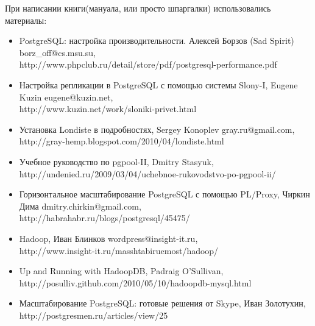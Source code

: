 \thispagestyle{empty}
При написании книги(мануала, или просто шпаргалки) использовались материалы:
\begin{itemize}
\item PostgreSQL: настройка производительности. Алексей Борзов (Sad Spirit) borz\_off@cs.msu.su, \\
http://www.phpclub.ru/detail/store/pdf/postgresql-performance.pdf
\item Настройка репликации в PostgreSQL с помощью системы Slony-I, Eugene Kuzin eugene@kuzin.net, \\
http://www.kuzin.net/work/sloniki-privet.html
\item Установка Londiste в подробностях, Sergey Konoplev gray.ru@gmail.com, \\
http://gray-hemp.blogspot.com/2010/04/londiste.html
\item Учебное руководство по pgpool-II, Dmitry Stasyuk, \\
http://undenied.ru/2009/03/04/uchebnoe-rukovodstvo-po-pgpool-ii/
\item Горизонтальное масштабирование PostgreSQL с помощью PL/Proxy, Чиркин Дима dmitry.chirkin@gmail.com, \\
http://habrahabr.ru/blogs/postgresql/45475/
\item Hadoop, Иван Блинков wordpress@insight-it.ru, \\
http://www.insight-it.ru/masshtabiruemost/hadoop/
\item Up and Running with HadoopDB, Padraig O'Sullivan, \\
http://posulliv.github.com/2010/05/10/hadoopdb-mysql.html
\item Масштабирование PostgreSQL: готовые решения от Skype, Иван Золотухин, \\
http://postgresmen.ru/articles/view/25
\end{itemize}


\clearpage